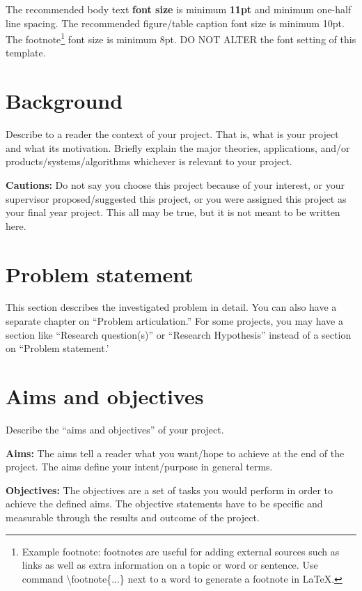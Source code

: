 The recommended body text \textbf{font size} is minimum \textbf{11pt} and minimum one-half line spacing. The recommended figure/table caption font size is minimum 10pt. The footnote\footnote{Example footnote: footnotes are useful for adding external sources such as links as well as extra information on a topic or word or sentence. Use command \textbackslash footnote\{...\} next to a word to generate a footnote in \LaTeX.} font size is minimum 8pt. DO NOT ALTER the font setting of this template.   

\section{Background}
\label{sec:into_back}
Describe to a reader the context of your project. That is, what is your project and what its motivation. Briefly explain the major theories, applications, and/or products/systems/algorithms whichever is relevant to your project.

\textbf{Cautions:} Do not say you choose this project because of your interest, or your supervisor proposed/suggested this project, or you were assigned this project as your final year project. This all may be true, but it is not meant to be written here.

\section{Problem statement}
\label{sec:intro_prob_art}
This section describes the investigated problem in detail. You can also have a separate chapter on ``Problem articulation.''  For some projects, you may have a section like ``Research question(s)'' or ``Research Hypothesis'' instead of a section on ``Problem statement.'

\section{Aims and objectives}
\label{sec:intro_aims_obj}
Describe the ``aims and objectives'' of your project. 

\textbf{Aims:} The aims tell a reader what you want/hope to achieve at the end of the project. The  aims define your intent/purpose in general terms.  

\textbf{Objectives:} The objectives are a set of tasks you would perform in order to achieve the defined aims. The objective statements have to be specific and measurable through the results and outcome of the project.



